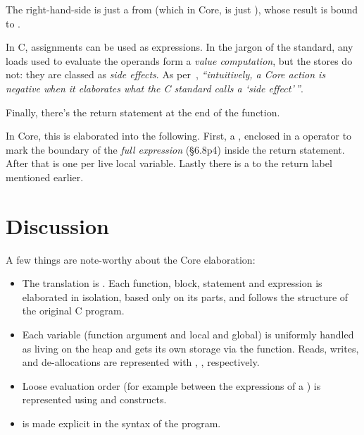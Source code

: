 The right-hand-side is just a  from  %
(which in Core, is just ), whose result is bound to
.


In C, assignments can be used as expressions. In the jargon of the standard,
any loads used to evaluate the operands form a \emph{value computation}, but
the stores do not: they are classed as \emph{side effects}.\label{sn:side-effect} As
per~\textcite[p61, p66, p99]{memarian2022cerberus}, \emph{``intuitively, a Core action
is negative when it elaborates what the C standard calls a `side
effect'\,''}.


Finally, there's the return statement at the end of the function.


In Core, this is elaborated into the following. First, a
, enclosed in a  operator %
to mark the boundary of the \emph{full expression} (§6.8p4) inside the return
statement. After that is one  per live  %
local variable. Lastly there is a  to the %
return label  mentioned earlier.


\section{Discussion}

A few things are note-worthy about the Core elaboration:
\begin{itemize}
    \item The translation is . Each function, block,
        statement and expression is elaborated in isolation, based only
        on its parts, and follows the structure of the original C program.
    \item Each variable (function argument and local and global) is uniformly
        handled as living on the heap and gets its own storage via the
         function. Reads, writes, and de-allocations are
        represented with , ,
         respectively.
    \item Loose evaluation order (for example between the expressions of a \cinline{==})
        is represented using  and  constructs.
    \item {} is made explicit in the syntax of the program.
\end{itemize}

